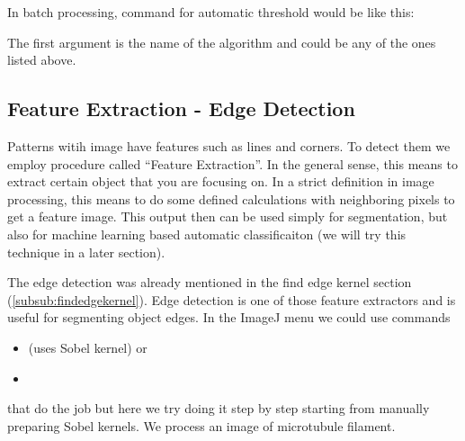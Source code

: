 In batch processing, command for automatic threshold would be like this:


The first argument is the name of the algorithm and could be any of the
ones listed above.
 
\subsection{Feature Extraction - Edge Detection}

Patterns witih image have features such as lines and corners. To detect them we employ procedure called ``Feature Extraction''. In the general sense, this means to extract certain object that you are focusing on. In a strict definition in image processing, this means to do some defined calculations with neighboring pixels to get a feature image. This output then can be used simply for segmentation, but also for machine learning based automatic classificaiton (we will try this technique in a later section). 

The edge detection was already mentioned in the find edge kernel section (\ref{subsub:findedgekernel}). Edge detection is one of those feature extractors and is useful for segmenting object edges. 
In the ImageJ menu we could use commands 
\begin{itemize}
\item {} (uses Sobel kernel) or 
\item {} 
\end{itemize}
that do the job but here we try doing it step by step starting from manually preparing Sobel kernels. We process an image of microtubule filament. 

